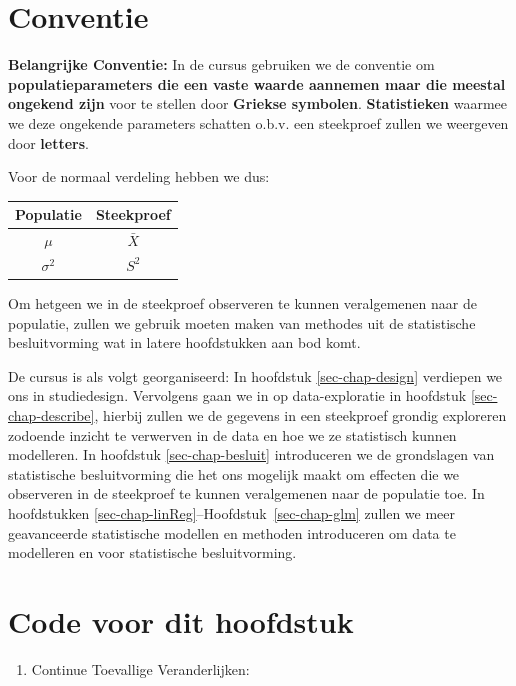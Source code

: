 \documentclass[
  dutch,
  letterpaper,
  12pt]{book}
\newcounter{none} %
\providecommand{\tightlist}{%
  \setlength{\itemsep}{0pt}\setlength{\parskip}{0pt}}
\theoremstyle{definition}
\theoremstyle{definition}
\theoremstyle{definition}
\theoremstyle{remark}
\begin{document}
\section{Conventie}\label{conventie}

\textbf{Belangrijke Conventie:} In de cursus gebruiken we de conventie
om \textbf{populatieparameters die een vaste waarde aannemen maar die
meestal ongekend zijn} voor te stellen door \textbf{Griekse symbolen}.
\textbf{Statistieken} waarmee we deze ongekende parameters schatten
o.b.v. een steekproef zullen we weergeven door \textbf{letters}.

Voor de normaal verdeling hebben we dus:

{\def\LTcaptype{none} %
\begin{longtable}[]{@{}cc@{}}
\toprule\noalign{}
Populatie & Steekproef \\
\midrule\noalign{}
\endhead
\bottomrule\noalign{}
\endlastfoot
\(\mu\) & \(\bar X\) \\
\(\sigma^2\) & \(S^2\) \\
\end{longtable}
}

Om hetgeen we in de steekproef observeren te kunnen veralgemenen naar de
populatie, zullen we gebruik moeten maken van methodes uit de
statistische besluitvorming wat in latere hoofdstukken aan bod komt.

De cursus is als volgt georganiseerd: In hoofdstuk \ref{sec-chap-design}
verdiepen we ons in studiedesign. Vervolgens gaan we in op
data-exploratie in hoofdstuk \ref{sec-chap-describe}, hierbij zullen we
de gegevens in een steekproef grondig exploreren zodoende inzicht te
verwerven in de data en hoe we ze statistisch kunnen modelleren. In
hoofdstuk \ref{sec-chap-besluit} introduceren we de grondslagen van
statistische besluitvorming die het ons mogelijk maakt om effecten die
we observeren in de steekproef te kunnen veralgemenen naar de populatie
toe. In hoofdstukken \ref{sec-chap-linReg}--Hoofdstuk~\ref{sec-chap-glm}
zullen we meer geavanceerde statistische modellen en methoden
introduceren om data te modelleren en voor statistische besluitvorming.

\section{Code voor dit hoofdstuk}\label{code-voor-dit-hoofdstuk}

\begin{enumerate}
\def\labelenumi{\arabic{enumi}.}
\tightlist
\item
  Continue Toevallige Veranderlijken:
\end{enumerate}
\end{document}
